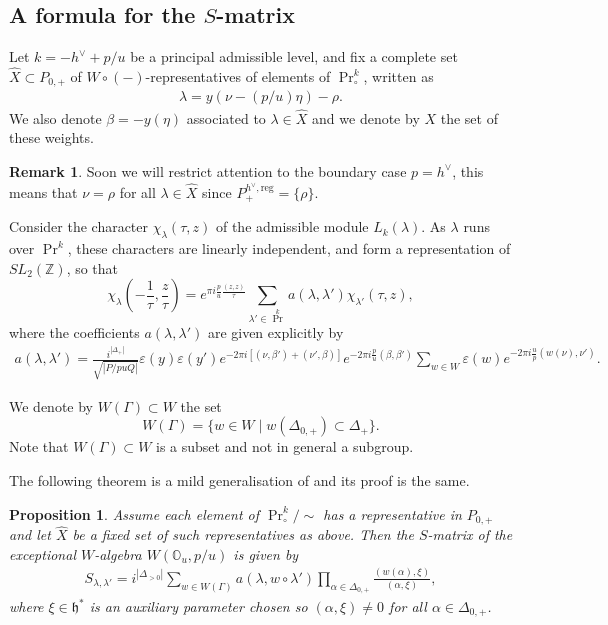 \documentclass[12pt]{amsart}
\theoremstyle{plain}
\newtheorem{prop}[thm]{Proposition}
\theoremstyle{definition}
\newtheorem{rem}[thm]{Remark}
\numberwithin{equation}{section}
\newcommand{\laset}{\widehat{X}}
\newcommand{\beset}{X}
\newcommand{\al}{\alpha}
\newcommand{\la}{\lambda}
\newcommand{\D}{\Delta}
\newcommand{\Z}{\mathbb{Z}}
\newcommand{\h}{\mathfrak{h}}
\newcommand{\mbo}{\mathbb{O}}
\DeclareMathOperator{\prin}{Pr}
\begin{document}
\subsection{A formula for the $S$-matrix}\label{subsec:S-mat.genfla}


Let $k = -h^\vee + p/u$ be a principal admissible level, and fix a complete set $\laset \subset P_{0, +}$ of $W \circ (-)$-representatives of elements of $\prin^k_\circ$, written as
\begin{align*}
\la = y(\nu - (p/u) \eta) - \rho.
\end{align*}
We also denote $\beta = -y(\eta)$ associated to $\la \in \laset$ and we denote by $\beset$ the set of these weights.
\begin{rem}
Soon we will restrict attention to the boundary case $p = h^\vee$, this means that $\nu = \rho$ for all $\la \in \laset$ since $P_{+}^{h^\vee, \text{reg}} = \{\rho\}$.
\end{rem}

Consider the character $\chi_\la(\tau, z)$ of the admissible module $L_k(\la)$. As $\la$ runs over $\prin^k$, these characters are linearly independent, and form a representation of $SL_2(\Z)$, so that \cite{KW89}
\[
\chi_\la\left(-\frac{1}{\tau}, \frac{z}{\tau}\right) = e^{\pi i \frac{p}{u} \frac{(z, z)}{\tau}} \sum_{\la' \in \prin^k} a(\la, \la') \chi_{\la'}(\tau, z),
\]
where the coefficients $a(\la, \la')$ are given explicitly by
\begin{align}\label{eq:aB}
a(\la, \la') = \frac{i^{|\D_+|}}{\sqrt{|P / puQ|}} \varepsilon(y) \varepsilon(y') e^{-2\pi i [(\nu, \beta') + (\nu', \beta)]} e^{-2\pi i \frac{p}{u} (\beta, \beta')} \sum_{w \in W} \varepsilon(w) e^{-2\pi i \frac{u}{p} (w(\nu), \nu')}.
\end{align}

We denote by $W(\Gamma) \subset W$ the set
\[
W(\Gamma) = \{w \in W \mid w(\D_{0, +}) \subset \D_+\}.
\]
Note that $W(\Gamma) \subset W$ is a subset and not in general a subgroup.

The following theorem is a mild generalisation of {\cite[Theorem 10.4]{AE2023}} and its proof is the same.
\begin{prop}\label{prop:S-matrix}
Assume each element of $\prin^k_\circ / \sim$ has a representative in $P_{0, +}$ and let $\laset$ be a fixed set of such representatives as above. Then the $S$-matrix of the exceptional $W$-algebra $W(\mbo_u, p/u)$ is given by
\begin{align}\label{eq:S.orig}
S_{\la, \la'} = i^{|\D_{>0}|} \sum_{w \in W(\Gamma)} a(\la, w \circ \la') \prod_{\al \in \D_{0, +}} \frac{(w(\al), \xi)}{(\al, \xi)},
\end{align}
where $\xi \in \h^*$ is an auxiliary parameter chosen so $(\al, \xi) \neq 0$ for all $\al \in \D_{0, +}$.
\end{prop}
\end{document}
